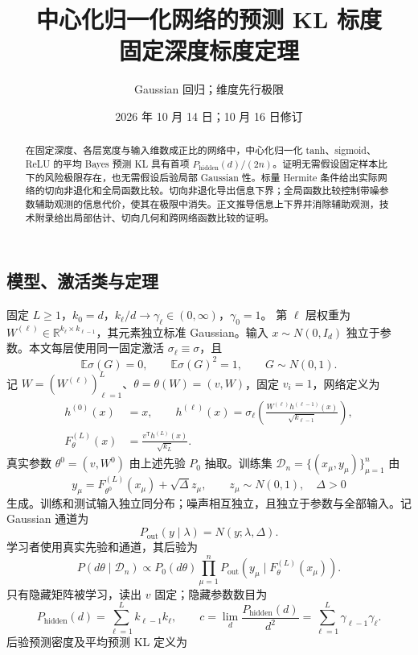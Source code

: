 \documentclass[a4paper]{tufte-handout}
\title{\texorpdfstring{中心化归一化网络的预测 KL 标度\\固定深度标度定理}{中心化归一化网络的预测 KL 标度：固定深度标度定理}}
\author{Gaussian 回归；维度先行极限}
\date{2026 年 10 月 14 日；10 月 16 日修订}
\newcommand{\E}{\mathbb E}
\newcommand{\R}{\mathbb R}
\newcommand{\Pall}{P_{\mathrm{hidden}}}
\newcommand{\Pout}{P_{\mathrm{out}}}
\begin{document}
\maketitle
\begin{abstract}
在固定深度、各层宽度与输入维数成正比的网络中，中心化归一化 tanh、sigmoid、ReLU 的平均 Bayes 预测 KL 具有首项 $\Pall(d)/(2n)$。证明无需假设固定样本比下的风险极限存在，也无需假设后验局部 Gaussian 性。标量 Hermite 条件给出实际网络的切向非退化和全局函数比较。切向非退化导出信息下界；全局函数比较控制带噪参数辅助观测的信息代价，使其在极限中消失。正文推导信息上下界并消除辅助观测，技术附录给出局部估计、切向几何和跨网络函数比较的证明。
\end{abstract}
\begin{fullwidth}

\section{模型、激活类与定理}
固定 $L\ge1$，$k_0=d$，$k_\ell/d\to\gamma_\ell\in(0,\infty)$，$\gamma_0=1$。
第 $\ell$ 层权重为 $W^{(\ell)}\in\R^{k_\ell\times k_{\ell-1}}$，其元素独立标准 Gaussian。输入 $x\sim N(0,I_d)$ 独立于参数。本文每层使用同一固定激活 $\sigma_\ell\equiv\sigma$，且
\[
\E\sigma(G)=0,\qquad\E\sigma(G)^2=1,\qquad G\sim N(0,1).
\]
记 $W=(W^{(\ell)})_{\ell=1}^L$、$\theta=\theta(W)=(v,W)$，固定 $v_i=1$，网络定义为
\begin{equation}\begin{aligned}
h^{(0)}(x)&=x,\qquad
h^{(\ell)}(x)=\sigma_\ell\!\left(\frac{W^{(\ell)}h^{(\ell-1)}(x)}{\sqrt{k_{\ell-1}}}\right),\\
F_\theta^{(L)}(x)&=\frac{v^{\mathsf T}h^{(L)}(x)}{\sqrt{k_L}}.
\end{aligned}\end{equation}
真实参数 $\theta^0=(v,W^0)$ 由上述先验 $P_0$ 抽取。训练集 $\mathcal D_n=\{(x_\mu,y_\mu)\}_{\mu=1}^n$ 由
\[
y_\mu=F_{\theta^0}^{(L)}(x_\mu)+\sqrt\Delta z_\mu,\qquad
z_\mu\sim N(0,1),\quad\Delta>0
\]
生成。训练和测试输入独立同分布；噪声相互独立，且独立于参数与全部输入。记 Gaussian 通道为
\[
\Pout(y\mid\lambda)=N(y;\lambda,\Delta).
\]
学习者使用真实先验和通道，其后验为
\[
P(d\theta\mid\mathcal D_n)\propto P_0(d\theta)
\prod_{\mu=1}^n\Pout\!\left(y_\mu\mid F_\theta^{(L)}(x_\mu)\right).
\]
只有隐藏矩阵被学习，读出 $v$ 固定；隐藏参数数目为
\[
\Pall(d)=\sum_{\ell=1}^Lk_{\ell-1}k_\ell,\qquad
c=\lim_d\frac{\Pall(d)}{d^2}
=\sum_{\ell=1}^L\gamma_{\ell-1}\gamma_\ell.
\]
后验预测密度及平均预测 KL 定义为
\begin{equation}\begin{aligned}

\end{aligned}
\end{equation}
\end{fullwidth}
\end{document}
